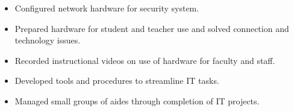 \documentclass[10pt,a4paper,ragged2e,withhyper]{altacv}
\begin{document}
\divider

\begin{itemize}
\item Configured network hardware for security system.
\item Prepared hardware for student and teacher use and solved connection and technology issues.
\item Recorded instructional videos on use of hardware for faculty and staff.
\item Developed tools and procedures to streamline IT tasks.
\item Managed small groups of aides through completion of IT projects.
\end{itemize}
















\end{document}
